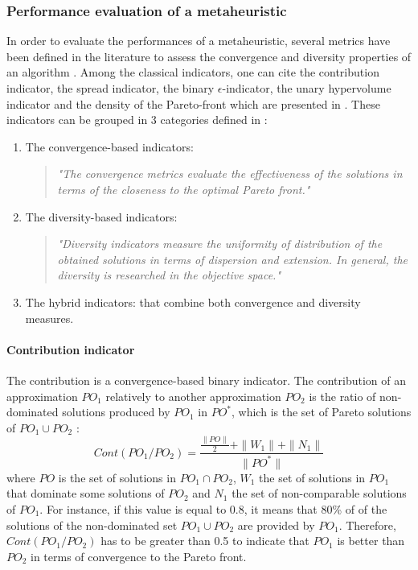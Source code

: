\subsubsection{Performance evaluation of a metaheuristic}
In order to evaluate the performances of a metaheuristic, several metrics have been defined in the literature to assess the convergence and diversity properties of an algorithm \cite{talbi09}. Among the classical indicators, one can cite the contribution indicator, the spread indicator, the binary $\epsilon$-indicator, the unary hypervolume indicator and the density of the Pareto-front which are presented in \cite{talbi09, 1197687}. These indicators can be grouped in 3 categories defined in \cite{talbi09}:
\begin{enumerate}
	\item The convergence-based indicators:
	\begin{quote}
		\emph{"The convergence metrics evaluate the effectiveness of the solutions in terms of the closeness to the optimal Pareto front."}
	\end{quote}
	\item The diversity-based indicators:
	\begin{quote}
		\emph{"Diversity indicators measure the uniformity of distribution of the obtained solutions in terms of dispersion and extension. In general, the diversity is researched in the objective space."}
	\end{quote}
	\item The hybrid indicators: that combine both convergence and diversity measures.
\end{enumerate}


\paragraph{Contribution indicator}
The contribution is a convergence-based binary indicator. The contribution of an approximation $PO_1$ relatively to another approximation $PO_2$ is the ratio of non-dominated solutions produced by $PO_1$ in $PO^*$, which is the set of Pareto solutions of $PO_1 \cup PO_2$ \cite{talbi09}:
\begin{equation}
Cont(PO_1/PO_2) = \frac{\frac{\|PO\|}{2}+\|W_1\|+\|N_1\|}{\|PO^*\|}
\end{equation}
where $PO$ is the set of solutions in $PO_1 \cap PO_2$, $W_1$ the set of solutions in $PO_1$ that dominate some solutions of $PO_2$ and $N_1$ the set of non-comparable solutions of $PO_1$. For instance, if this value is equal to 0.8, it means that 80\% of of the solutions of the non-dominated set $PO_1 \cup PO_2$ are provided by $PO_1$. Therefore, $Cont(PO_1/PO_2)$ has to be greater than 0.5 to indicate that $PO_1$ is better than $PO_2$ in terms of convergence to the Pareto front.

